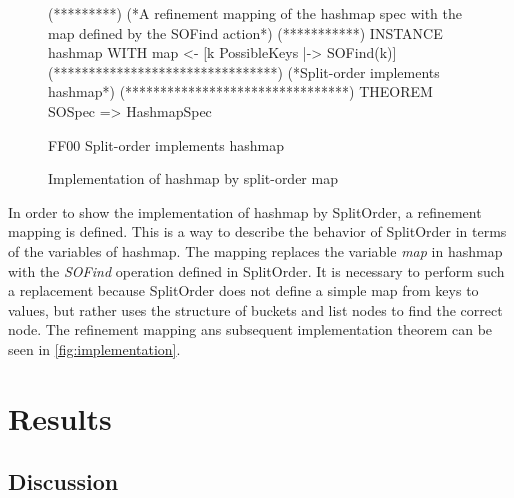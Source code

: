 \documentclass{uit-thesis}
\begin{document}
\begin{figure}
    \begin{tla}
        (*********)
(*A refinement mapping of the hashmap spec with the map defined by the SOFind action*)
(***********)
INSTANCE hashmap WITH map <- [k \in PossibleKeys |-> SOFind(k)]
(********************************)
(*Split-order implements hashmap*)
(********************************)
THEOREM SOSpec => HashmapSpec
    \end{tla}
\begin{tlatex}
\@x{}%
%
\@xx{}%
\begin{lcom}{0}%
\begin{cpar}{0}{F}{F}{0}{0}{}%
Split-order implements hashmap
\end{cpar}%
\end{lcom}%
%
\end{tlatex}
\caption{Implementation of hashmap by split-order map}
\label{fig:implementation}
\end{figure}

In order to show the implementation of hashmap by SplitOrder, a refinement mapping is defined. This is a way to describe the behavior of SplitOrder in terms of the variables of hashmap. The mapping replaces the variable \textit{map} in hashmap with the \textit{SOFind} operation defined in SplitOrder. It is necessary to perform such a replacement because SplitOrder does not define a simple map from keys to values, but rather uses the structure of buckets and list nodes to find the correct node. The refinement mapping ans subsequent implementation theorem can be seen in \autoref{fig:implementation}.
\chapter{Results}\label{ch:results}
\section{Discussion}\label{sec:discussion}

\backmatter
\printbibliography{}
\appendix
{}
\end{document}
